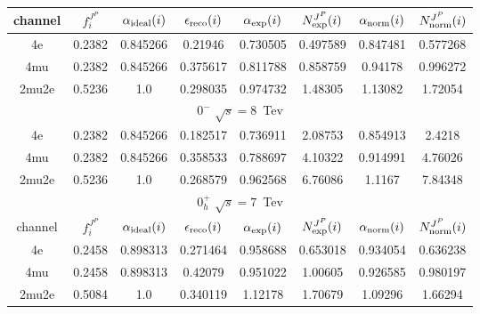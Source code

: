 \begin{table}[b]
\begin{tabular}{c c c c c c c c}
channel & $f_{i}^{J^P}$ & $\alpha_{\rm ideal} (i)$ & $\epsilon_{\rm reco} (i)$ & $\alpha_{\rm exp} (i)$ & $N^{J^P}_{\rm exp} (i)$ & $\alpha_{\rm norm} (i)$ & $N^{J^P}_{\rm norm} (i)$\\ \hline 
4e & 0.2382 & 0.845266 & 0.21946 & 0.730505
 & 0.497589%
 & 0.847481 & 0.577268 \\ \hline 
4mu & 0.2382 & 0.845266 & 0.375617 & 0.811788
 & 0.858759%
 & 0.94178 & 0.996272 \\ \hline 
2mu2e & 0.5236 & 1.0  & 0.298035 & 0.974732
 & 1.48305%
 & 1.13082 & 1.72054 \\ \hline \hline 

\multicolumn{8}{|c|}{$0^{-}$ $\sqrt{s}=8$~Tev} \\ \hline 

4e & 0.2382 & 0.845266 & 0.182517 & 0.736911
 & 2.08753%
 & 0.854913 & 2.4218 \\ \hline 
4mu & 0.2382 & 0.845266 & 0.358533 & 0.788697
 & 4.10322%
 & 0.914991 & 4.76026 \\ \hline 
2mu2e & 0.5236 & 1.0  & 0.268579 & 0.962568
 & 6.76086%
 & 1.1167 & 7.84348 \\ \hline \hline 

 \multicolumn{8}{|c|}{$0^{+}_{h}$ $\sqrt{s}=7$~Tev} \\ \hline 

channel & $f_{i}^{J^P}$ & $\alpha_{\rm ideal} (i)$ & $\epsilon_{\rm reco} (i)$ & $\alpha_{\rm exp} (i)$ & $N^{J^P}_{\rm exp} (i)$ & $\alpha_{\rm norm} (i)$ & $N^{J^P}_{\rm norm} (i)$\\ \hline 
4e & 0.2458 & 0.898313 & 0.271464 & 0.958688
 & 0.653018%
 & 0.934054 & 0.636238 \\ \hline 
4mu & 0.2458 & 0.898313 & 0.42079 & 0.951022
 & 1.00605%
 & 0.926585 & 0.980197 \\ \hline 
2mu2e & 0.5084 & 1.0  & 0.340119 & 1.12178
 & 1.70679%
 & 1.09296 & 1.66294 \\ \hline \hline 


\end{tabular}
\end{table}
